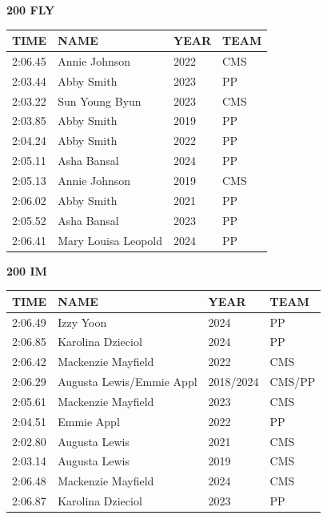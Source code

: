 \begin{table}[H]
\centering
\begin{minipage}[t]{0.48\textwidth}
\centering
\textbf{200 FLY}\\[0.1cm]
\begin{tabular}{@{}p{1.8cm}p{2.8cm}p{1.2cm}p{1.4cm}@{}}
\hline
    \textbf{TIME} & \textbf{NAME} & \textbf{YEAR} & \textbf{TEAM} \\
\hline
    2:06.45 & Annie Johnson & 2022 & CMS \\
    2:03.44 & Abby Smith & 2023 & PP \\
    2:03.22 & Sun Young Byun & 2023 & CMS \\
    2:03.85 & Abby Smith & 2019 & PP \\
    2:04.24 & Abby Smith & 2022 & PP \\
    2:05.11 & Asha Bansal & 2024 & PP \\
    2:05.13 & Annie Johnson & 2019 & CMS \\
    2:06.02 & Abby Smith & 2021 & PP \\
    2:05.52 & Asha Bansal & 2023 & PP \\
    2:06.41 & Mary Louisa Leopold & 2024 & PP \\
\hline
\end{tabular}
\end{minipage}\hfill
\begin{minipage}[t]{0.48\textwidth}
\centering
\textbf{200 IM}\\[0.1cm]
\begin{tabular}{@{}p{1.8cm}p{2.8cm}p{1.2cm}p{1.4cm}@{}}
\hline
    \textbf{TIME} & \textbf{NAME} & \textbf{YEAR} & \textbf{TEAM} \\
\hline
    2:06.49 & Izzy Yoon & 2024 & PP \\
    2:06.85 & Karolina Dzieciol & 2024 & PP \\
    2:06.42 & Mackenzie Mayfield & 2022 & CMS \\
    2:06.29 & Augusta Lewis/Emmie Appl & 2018/2024 & CMS/PP \\
    2:05.61 & Mackenzie Mayfield & 2023 & CMS \\
    2:04.51 & Emmie Appl & 2022 & PP \\
    2:02.80 & Augusta Lewis & 2021 & CMS \\
    2:03.14 & Augusta Lewis & 2019 & CMS \\
    2:06.48 & Mackenzie Mayfield & 2024 & CMS \\
    2:06.87 & Karolina Dzieciol & 2023 & PP \\
\hline
\end{tabular}
\end{minipage}
\end{table}


